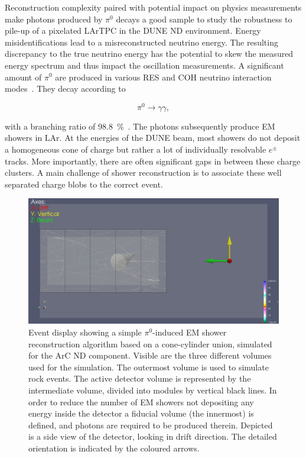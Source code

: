 \documentclass[a4paper]{article}
\begin{document}
Reconstruction complexity paired with potential impact on physics measurements make photons produced by $\pi^0$ decays a good sample to study the robustness to pile-up of a pixelated LArTPC in the DUNE ND environment.
Energy misidentifications lead to a misreconstructed neutrino energy.
The resulting discrepancy to the true neutrino energy has the potential to skew the measured energy spectrum and thus impact the oscillation measurements.
A significant amount of $\pi^0$ are produced in various RES and COH neutrino interaction modes~\cite{dune2}.
They decay according to

\begin{equation*}
	\pi^0\rightarrow\gamma\gamma,
\end{equation*}

with a branching ratio of \SI{98.8}{\percent}~\cite{pdg}.
The photons subsequently produce EM showers in LAr.
At the energies of the DUNE beam, most showers do not deposit a homogeneous cone of charge but rather a lot of individually resolvable $e^\pm$ tracks.
More importantly, there are often significant gaps in between these charge clusters.
A main challenge of shower reconstruction is to associate these well separated charge blobs to the correct event.

\begin{figure}[tbp]
	\centering
	\includegraphics[width=\textwidth]{Figures/uid0_spill6_event461_gamma19_x}
	\caption[Pile-up study example event]{%
		Event display showing a simple $\pi^0$-induced EM shower reconstruction algorithm based on a cone-cylinder union, simulated for the ArC ND component.
		Visible are the three different volumes used for the simulation.
		The outermost volume is used to simulate rock events.
		The active detector volume is represented by the intermediate volume, divided into modules by vertical black lines.
		In order to reduce the number of EM showers not depositing any energy inside the detector a fiducial volume (the innermost) is defined, and photons are required to be produced therein.
		Depicted is a side view of the detector, looking in drift direction.
		The detailed orientation is indicated by the coloured arrows.
	}
	\label{fig:dune-nd_example-display}
\end{figure}
\end{document}
